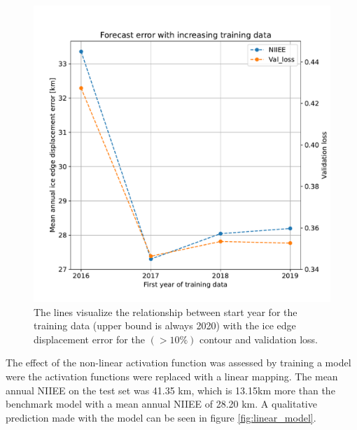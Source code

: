 \documentclass[../main/thesis]{subfiles}
\begin{document}
\begin{figure}
    \centering
    \includegraphics[width=.9\textwidth]{years_start.pdf}
    \caption{\label{fig:append_years}The lines visualize the relationship between start year for the training data (upper bound is always 2020) with the ice edge displacement error for the $(> 10\%)$ contour and validation loss.}
\end{figure}

The effect of the non-linear activation function was assessed by training a model were the activation functions were replaced with a linear mapping. The mean annual NIIEE on the test set was 41.35 km, which is 13.15km more than the benchmark model with a mean annual NIIEE of 28.20 km. A qualitative prediction made with the model can be seen in figure \ref{fig:linear_model}. 
\end{document}
